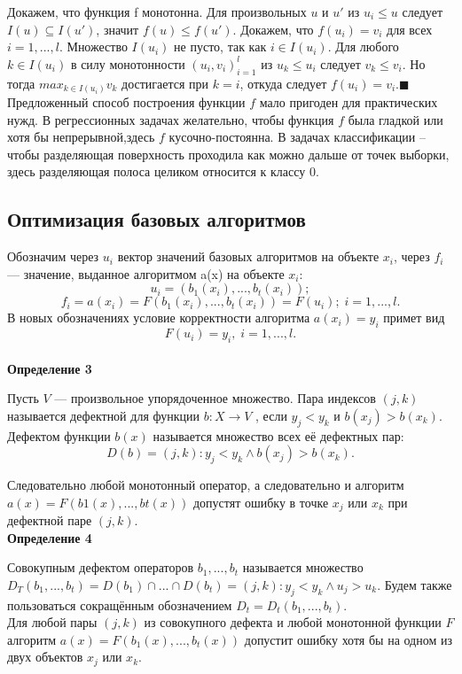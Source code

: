 Докажем, что функция f монотонна. Для произвольных $u$ и $u\prime $ из $u_i \leq u$ следует $I(u)\subseteq I( u\prime)$, значит $f(u)\leq f(u\prime )$.
Докажем, что $f(u_i) = v_i$ для всех $i = 1, . . . , l$. Множество $I(u_i)$ не пусто, так
как $i \in I(u_i)$. Для любого $k \in I(u_i)$ в силу монотонности $(u_i, v_i)^l_{i=1}$ из $u_k \leq u_i$ следует $v_k \leq v_i$. Но тогда $max_{k\in I(u_i)} v_k$ достигается при $k = i$, откуда следует $f(u_i) = v_i$.$\blacksquare$\\




Предложенный способ построения функции $f$ мало пригоден для практических нужд.
В регрессионных задачах желательно, чтобы функция $f$ была гладкой или хотя бы непрерывной,здесь  $f$ кусочно-постоянна. В задачах классификации  -- чтобы разделяющая поверхность проходила как можно дальше от точек выборки, здесь разделяющая полоса целиком относится к классу 0.


\subsection{Оптимизация базовых алгоритмов}

Обозначим через $u_i$ вектор значений базовых алгоритмов на объекте $x_i$, через $f_i$ — значение, выданное алгоритмом a(x) на объекте $x_i$:
\[u_i = (b_1(x_i), . . . , b_t(x_i));\]
\[f_i = a(x_i) = F(b_1(x_i), . . . , b_t(x_i)) = F(u_i); \; i = 1, . . . , l.\]
В новых обозначениях условие корректности алгоритма $a(x_i) = y_i$ примет вид
\[F(u_i) = y_i
    , \; i = 1, . . . , l.
\]\\

\textbf{Определение 3}

Пусть $V$ — произвольное упорядоченное множество. Пара индексов $(j, k)$
называется дефектной для функции $b : X \rightarrow V$ , если $y_j < y_k$ и $b(x_j ) > b(x_k)$. Дефектом функции $b(x)$ называется множество всех её дефектных пар:
\[D(b) = {(j, k): y_j < y_k \wedge b(x_j ) > b(x_k)} .\]


Следовательно любой монотонный оператор, а следовательно и алгоритм $a(x) = F(b1(x), . . . , bt(x)) $ допустят ошибку в точке $x_j$ или $x_k$ при дефектной паре $(j, k)$.
\\

\textbf{Определение 4}

Совокупным дефектом операторов $b_1, . . . , b_t$ называется множество
$D_T (b_1, . . . , b_t) = D(b_1) \cap ... \cap D(b_t) = {(j, k): y_j < y_k \wedge u_j > u_k}.$
Будем также пользоваться сокращённым обозначением $D_t = D_t(b_1, . . . , b_t).$
\\
Для любой пары $(j, k)$ из совокупного дефекта и любой монотонной функции $F$ алгоритм $a(x) = F(b_1(x), . . . , b_t(x)) $ допустит ошибку хотя бы на одном из двух объектов $x_j$ или $x_k$.\\

